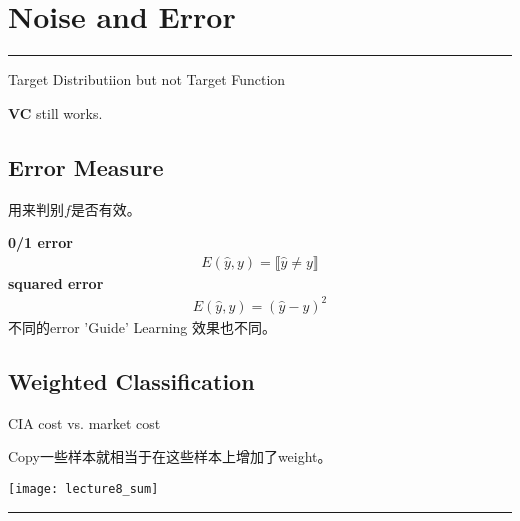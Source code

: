\section{Noise and Error}
\noindent
{\color{RubineRed} \rule{\linewidth}{1mm} }
Target Distributiion but not Target Function \par
\textbf{VC} still works. \par

\subsection{Error Measure}
用来判别$f$是否有效。 \par
\textbf{0/1 error}
\begin{align*}
E(\hat{y},y) = \llbracket \hat{y} \neq y \rrbracket
\end{align*}
\textbf{squared error}
\begin{align*}
E(\hat{y},y) = (\hat{y} -y)^2
\end{align*}
不同的error 'Guide' Learning 效果也不同。 \par
\subsection{Weighted Classification}
CIA cost vs. market cost \par
Copy一些样本就相当于在这些样本上增加了weight。 \par\par
\begin{center}
\texttt{[image: lecture8\_sum]}\\
\end{center}
\noindent
{\color{LightRubineRed} \rule{\linewidth}{1mm} }